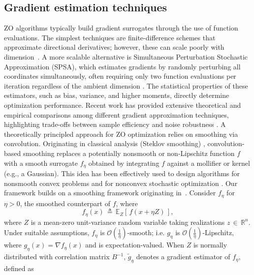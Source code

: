 \documentclass[11pt,reqno]{amsart}
\newcommand{\1}{{\bf 1}}
\newcommand{\2}{{\bf 2}}
\numberwithin{equation}{section}
\theoremstyle{remark}
\begin{document}
		\subsection{Gradient estimation techniques}
		ZO algorithms typically build gradient surrogates through the use of function evaluations. The simplest techniques are finite-difference schemes that approximate directional derivatives; however, these can scale poorly with dimension~\cite{berahas2022theoretical}. A more scalable alternative is Simultaneous Perturbation Stochastic Approximation (SPSA), which estimates gradients by randomly perturbing all coordinates simultaneously, often requiring only two function evaluations per iteration regardless of the ambient dimension \cite{spall1992multivariate}. The statistical properties of these estimators, such as bias, variance, and higher moments, directly determine optimization performance. Recent work has provided extensive theoretical and empirical comparisons among different gradient approximation techniques, highlighting trade-offs between sample efficiency and noise robustness \cite{berahas2022theoretical}. A theoretically principled approach for ZO optimization relies on smoothing via convolution. Originating in classical analysis (Steklov smoothing) \cite{steklov1}, convolution-based smoothing replaces a potentially nonsmooth or non-Lipschitz function $f$ with a smooth surrogate $f_\eta$ obtained by integrating $f$ against a mollifier or kernel (e.g., a Gaussian). This idea has been effectively used to design algorithms for nonsmooth convex problems \cite{DeFarias08,Farzad1,nemirovski83problem} and for nonconvex stochastic optimization \cite{ghadimi2013stochastic,nesterov2017random}. Our framework builds on a smoothing framework originating in~\cite{steklov1}.   Consider $f_{\eta}$ for $\eta > 0$, the smoothed counterpart of $f$, where 
		\begin{equation}
			f_{\eta}(x) \, \triangleq \, \mathbb{E}_{Z}\left[ \, f(x+{\eta}Z) \, \right], 
		\end{equation}
		where $Z$ is a mean-zero unit-variance random variable taking realizations $z \, \in \,
		\mathbb{R}^n$. Under suitable assumptions, $f_{\eta}$ is
		$\mathcal{O}(\tfrac{1}{\eta})$-smooth; {i.e. $g_{\eta}$ is $\mathcal{O}(\tfrac{1}{\eta})$-Lipschitz}, where $g_{\eta}(x) = \nabla
		f_{\eta}(x) $ and is expectation-valued. When $Z$ is normally distributed 
		with correlation matrix $B^{-1}$,  $\tilde{g}_{\eta}$  denotes a
		gradient estimator of $f_{\eta}$, defined as   
\end{document}
